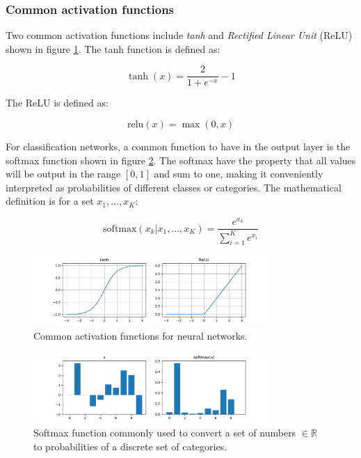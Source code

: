 \subsubsection{Common activation functions}

Two common activation functions include \textit{tanh} and \textit{Rectified
Linear Unit} (ReLU) shown in figure \ref{fig:tanh_relu}. The tanh function is defined as:

\begin{equation}
    \tanh(x) = \frac{2}{1+e^{-x}} - 1
\end{equation}

The ReLU is defined as:

\begin{equation}
    \text{relu}(x) = \max (0, x)
\end{equation}

For classification networks, a common function to have in the output layer is
the softmax function shown in figure \ref{fig:softmax}. The softmax have the
property that all values will be output in the range $[0, 1]$ and sum to one,
making it conveniently interpreted as probabilities of different classes or
categories. The mathematical definition is for a set $x_1, ..., x_K$:

\begin{equation}
    \text{softmax}(x_k|x_1, ..., x_K) = \frac{e^{x_k}}{\sum_{i=1}^K e^{x_i}}
\end{equation}

\begin{figure}[h]
    \centering
    \includegraphics[width=0.8\textwidth]{res/relu_tanh.pdf}

    \caption{Common activation functions for neural networks.}

    \label{fig:tanh_relu}
\end{figure}

\begin{figure}[h]
    \centering
    \includegraphics[width=0.8\textwidth]{res/softmax.pdf}

    \caption{Softmax function commonly used to convert a set of numbers $\in \mathbb{R}$ to probabilities of a discrete set of categories.}

    \label{fig:softmax}
\end{figure}

